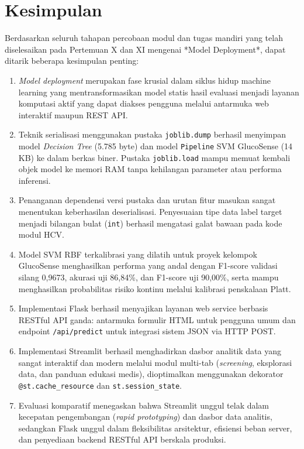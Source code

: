 \documentclass[a4paper,oneside,12pt]{report}
\begin{document}
\clearpage

\chapter{Kesimpulan}
Berdasarkan seluruh tahapan percobaan modul dan tugas mandiri yang telah diselesaikan pada Pertemuan X dan XI mengenai *Model Deployment*, dapat ditarik beberapa kesimpulan penting:
\begin{enumerate}[noitemsep, topsep=2pt, parsep=1pt]
	\item \textit{Model deployment} merupakan fase krusial dalam siklus hidup machine learning yang mentransformasikan model statis hasil evaluasi menjadi layanan komputasi aktif yang dapat diakses pengguna melalui antarmuka web interaktif maupun REST API.
	\item Teknik serialisasi menggunakan pustaka \texttt{joblib.dump} berhasil menyimpan model \textit{Decision Tree} (5.785 byte) dan model \texttt{Pipeline} SVM GlucoSense (14 KB) ke dalam berkas biner. Pustaka \texttt{joblib.load} mampu memuat kembali objek model ke memori RAM tanpa kehilangan parameter atau performa inferensi.
	\item Penanganan dependensi versi pustaka dan urutan fitur masukan sangat menentukan keberhasilan deserialisasi. Penyesuaian tipe data label target menjadi bilangan bulat (\texttt{int}) berhasil mengatasi galat bawaan pada kode modul HCV.
	\item Model SVM RBF terkalibrasi yang dilatih untuk proyek kelompok GlucoSense menghasilkan performa yang andal dengan F1-score validasi silang 0,9673, akurasi uji 86,84\%, dan F1-score uji 90,00\%, serta mampu menghasilkan probabilitas risiko kontinu melalui kalibrasi penskalaan Platt.
	\item Implementasi Flask berhasil menyajikan layanan web service berbasis RESTful API ganda: antarmuka formulir HTML untuk pengguna umum dan endpoint \texttt{/api/predict} untuk integrasi sistem JSON via HTTP POST.
	\item Implementasi Streamlit berhasil menghadirkan dasbor analitik data yang sangat interaktif dan modern melalui modul multi-tab (\textit{screening}, eksplorasi data, dan panduan edukasi medis), dioptimalkan menggunakan dekorator \texttt{@st.cache\_resource} dan \texttt{st.session\_state}.
	\item Evaluasi komparatif menegaskan bahwa Streamlit unggul telak dalam kecepatan pengembangan (\textit{rapid prototyping}) dan dasbor data analitis, sedangkan Flask unggul dalam fleksibilitas arsitektur, efisiensi beban server, dan penyediaan backend RESTful API berskala produksi.
\end{enumerate}
\end{document}

